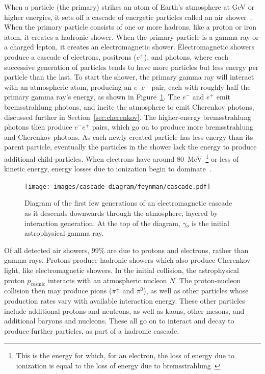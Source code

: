   When a particle (the primary) strikes an atom of Earth's atmosphere at GeV or higher energies, it sets off a cascade of energetic particles called an air shower~\cite{Bethe1934,Klein1999}.
  When the primary particle consists of one or more hadrons, like a proton or iron atom, it creates a hadronic shower.
  When the primary particle is a gamma ray or a charged lepton, it creates an electromagnetic shower.
  Electromagnetic showers produce a cascade of electrons, positrons ($e^{+}$), and photons, where each successive generation of particles tends to have more particles but less energy per particle than the last.
  To start the shower, the primary gamma ray will interact with an atmospheric atom, producing an $e^{-}e^{+}$ pair, each with roughly half the primary gamma ray's energy, as shown in Figure~\ref{fig:emcascade}.
  The $e^{-}$ and $e^{+}$ emit bremsstrahlung photons, and incite the atmosphere to emit Cherenkov photons, discussed further in Section~\ref{sec:cherenkov}.
  The higher-energy bremsstrahlung photons then produce $e^{-}e^{+}$ pairs, which go on to produce more bremsstrahlung and Cherenkov photons.
  As each newly created particle has less energy than its parent particle, eventually the particles in the shower lack the energy to produce additional child-particles.
  When electrons have around \SI{80}{\MeV{}}\footnote{This is the energy for which, for an electron, the loss of energy due to ionization is equal to the loss of energy due to bremsstrahlung~\cite{tanabashi2018review,berger196410}} or less of kinetic energy, energy losses due to ionization begin to dominate~\cite{pdg_2014}.

  \begin{figure}[t]
    \centering
    \texttt{[image: images/cascade\_diagram/feynman/cascade.pdf]}
    \caption[Electromagnetic Cascade]{
      Diagram of the first few generations of an electromagnetic cascade as it descends downwards through the atmosphere, layered by interaction generation. %
      At the top of the diagram, $\gamma{}_o$ is the initial astrophysical gamma ray.
      \CaptionBlankLine
    }
    \label{fig:emcascade}
  \end{figure}

  Of all detected air showers, \nicetilde{}99\% are due to protons and electrons, rather than gamma rays.
  Protons produce hadronic showers which also produce Cherenkov light, like electromagnetic showers.
  In the initial collision, the astrophysical proton $p_{\textrm{cosmic}}$ interacts with an atmospheric nucleon $N$.
  The proton-nucleon collision then may produce pions ($\pi^{\pm}$ and $\pi^{0}$), as well as other particles whose production rates vary with available interaction energy.
  These other particles include additional protons and neutrons, as well as kaons, other mesons, and additional baryons and nucleons.
  These all go on to interact and decay to produce further particles, as part of a hadronic cascade.

